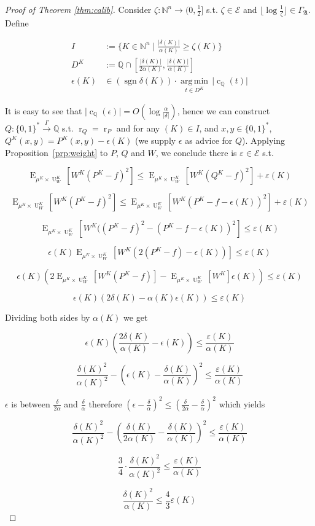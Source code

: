 \documentclass{article}
\numberwithin{equation}{section}
\theoremstyle{definition}
\theoremstyle{plain}
\newcommand{\Bool}{\{0,1\}}
\newcommand{\Words}{{\Bool^*}}
\DeclareMathOperator{\Sgn}{sgn}
\DeclareMathOperator{\E}{E}
\DeclareMathOperator{\R}{r}
\DeclareMathOperator{\Un}{U}
\DeclareMathOperator{\En}{c}
\newcommand{\Argmin}[1]{\underset{#1}{\operatorname{arg\,min}}\,}
\newcommand{\Nats}{\mathbb{N}}
\newcommand{\Rats}{\mathbb{Q}}
\newcommand{\Abs}[1]{\lvert #1 \rvert}
\newcommand{\Floor}[1]{\lfloor #1 \rfloor}
\newcommand{\GrowA}{\Gamma_{\mathfrak{A}}}
\newcommand{\Fall}{\mathcal{E}}
\newcommand{\Scheme}{\xrightarrow{\Gamma}}
\begin{document}
\begin{proof}[Proof of Theorem \ref{thm:calib}]

Consider $\zeta: \Nats^n \rightarrow (0,\frac{1}{2}]$ s.t.  $\zeta \in \Fall$ and $\Floor{\log \frac{1}{\zeta}} \in \GrowA$. Define 

\begin{align*}
I&:=\{K \in \Nats^n \mid \frac{\Abs{\delta(K)}}{\alpha(K)} \geq \zeta(K)\} \\
D^{K}&:=\Rats \cap [\frac{\Abs{\delta(K)}}{2\alpha(K)},\frac{\Abs{\delta(K)}}{\alpha(K)}] \\
\epsilon(K) &\in (\Sgn \delta(K)) \cdot \Argmin{t \in D^{K}} \Abs{\En_\Rats(t)}
\end{align*}

It is easy to see that ${\Abs{\En_\Rats(\epsilon)} = O(\log \frac{\alpha}{\Abs{\delta}})}$, hence we can construct $Q: \Words \Scheme \Rats$ s.t. $\R_Q=\R_P$ and for any $(K) \in I$, and $x,y \in \Words$, $Q^{K}(x,y)=P^{K}(x,y)-\epsilon(K)$ (we supply $\epsilon$ as advice for $Q$). Applying Proposition~\ref{prp:weight} to $P$, $Q$ and $W$, we conclude there is $\varepsilon \in \Fall$ s.t.

$$\E_{\mu^{K} \times \Un_W^{K}}[W^{K}(P^{K} - f)^2] \leq \E_{\mu^{K} \times \Un_W^{K}}[W^{K}(Q^{K}-f)^2] + \varepsilon(K)$$

$$\E_{\mu^{K} \times \Un_W^{K}}[W^{K}(P^{K} - f)^2] \leq \E_{\mu^{K} \times \Un_W^{K}}[W^{K}(P^{K}-f-\epsilon(K))^2] + \varepsilon(K)$$

$$\E_{\mu^{K} \times \Un_W^{K}}[W^{K}((P^{K} - f)^2 - (P^{K}-f-\epsilon(K))^2] \leq \varepsilon(K)$$

$$ \epsilon(K) \E_{\mu^{K} \times \Un_W^{K}}[W^{K}(2(P^{K} - f) - \epsilon(K))] \leq \varepsilon(K)$$

$$ \epsilon(K) (2 \E_{\mu^{K} \times \Un_W^{K}}[W^{K}(P^{K} - f)]-\E_{\mu^{K} \times \Un_W^{K}}[W^{K}]\epsilon(K)) \leq \varepsilon(K)$$

$$ \epsilon(K) (2 \delta(K) - \alpha(K)\epsilon(K)) \leq \varepsilon(K)$$

Dividing both sides by $ \alpha(K)$ we get

$$\epsilon(K) (\frac{2\delta(K)}{\alpha(K)} - \epsilon(K)) \leq \frac{\varepsilon(K)}{\alpha(K)}$$

$$\frac{\delta(K)^2}{\alpha(K)^2}-(\epsilon(K) - \frac{\delta(K)}{\alpha(K)})^2 \leq \frac{\varepsilon(K)}{\alpha(K)}$$

$\epsilon$ is between $\frac{\delta}{2\alpha}$ and $\frac{\delta}{\alpha}$ therefore $(\epsilon-\frac{\delta}{\alpha})^2 \leq (\frac{\delta}{2\alpha} - \frac{\delta}{\alpha})^2$  which yields

$$\frac{\delta(K)^2}{\alpha(K)^2}-(\frac{\delta(K)}{2\alpha(K)} - \frac{\delta(K)}{\alpha(K)})^2 \leq \frac{\varepsilon(K)}{\alpha(K)}$$

$$\frac{3}{4} \cdot \frac{\delta(K)^2}{\alpha(K)^2} \leq \frac{\varepsilon(K)}{\alpha(K)}$$

$$\frac{\delta(K)^2}{\alpha(K)} \leq \frac{4}{3}\varepsilon(K)$$
\end{proof}
\end{document}
